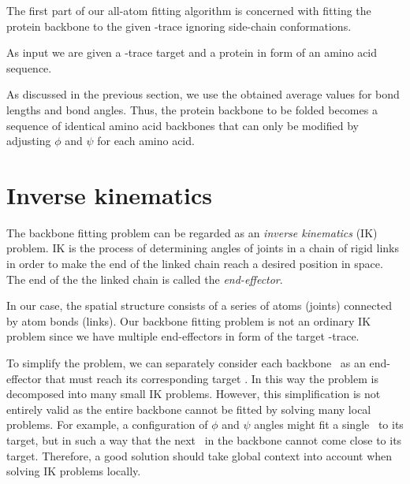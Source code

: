 The first part of our all-atom fitting algorithm is concerned with fitting the protein backbone to the given \Ca-trace ignoring side-chain conformations.

As input we are given a \Ca-trace target and a protein in form of an amino acid sequence.

As discussed in the previous section, we use the obtained average values for bond lengths and bond angles.
Thus, the protein backbone to be folded becomes a sequence of identical amino acid backbones that can only be modified by adjusting $\phi$ and $\psi$ for each amino acid.

\section{Inverse kinematics}
The backbone fitting problem can be regarded as an \emph{inverse kinematics} (IK) problem.
IK is the process of determining angles of joints in a chain of rigid links in order to make the end of the linked chain reach a desired position in space.
The end of the the linked chain is called the \emph{end-effector}.

In our case, the spatial structure consists of a series of atoms (joints) connected by atom bonds (links).
Our backbone fitting problem is not an ordinary IK problem since we have multiple end-effectors in form of the target \Ca-trace.

To simplify the problem, we can separately consider each backbone \Ca\ as an end-effector that must reach its corresponding target \Ca.
In this way the problem is decomposed into many small IK problems.
However, this simplification is not entirely valid as the entire backbone cannot be fitted by solving many local problems.
For example, a configuration of $\phi$ and $\psi$ angles might fit a single \Ca\ to its target, but in such a way that the next \Ca\ in the backbone cannot come close to its target.
Therefore, a good solution should take global context into account when solving IK problems locally. 


